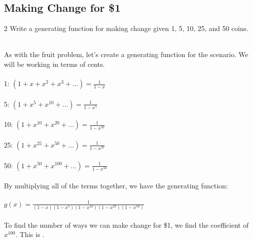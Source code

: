 \subsection*{Making Change for \$1}
\begin{problem}2 Write a generating function for making change given 1\textcent{}, 5\textcent{}, 10\textcent{}, 25\textcent{}, and 50\textcent{} coins. 
\end{problem}
\begin{solution} 
\\As with the fruit problem, let's create a generating function for the scenario. We will be working in terms of cents.\\\\
1\textcent{}: $(1+x+x^2+x^3+...)=\frac{1}{1-x}$ \\\\
5\textcent{}: $(1+x^5+x^10+...)=\frac{1}{1-x^5}$\\\\
10\textcent{}: $(1+x^10+x^20+...)=\frac{1}{1-x^{10}}$\\\\
25\textcent{}: $(1+x^25+x^50+...)=\frac{1}{1-x^{25}}$\\\\
50\textcent{}: $(1+x^50+x^100+...)=\frac{1}{1-x^{50}}$\\\\
By multiplying all of the terms together, we have the generating function: \\\\
$g(x)=\frac{1}{(1-x)(1-x^5)(1-x^{10})(1-x^{25})(1-x^{50})}$ \\\\
To find the number of ways we can make change for \$1, we find the coefficient of $x^{100}$. This is .


\end{solution}
